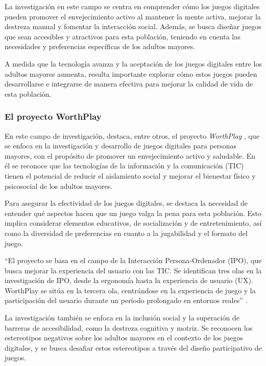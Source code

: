 La investigación en este campo se centra en comprender cómo los juegos digitales pueden promover el envejecimiento activo al mantener la mente activa, mejorar la destreza manual y fomentar la interacción social. Además, se busca diseñar juegos que sean accesibles y atractivos para esta población, teniendo en cuenta las necesidades y preferencias específicas de los adultos mayores.

A medida que la tecnología avanza y la aceptación de los juegos digitales entre los adultos mayores aumenta, resulta importante explorar cómo estos juegos pueden desarrollarse e integrarse de manera efectiva para mejorar la calidad de vida de esta población.


\subsubsection{El proyecto WorthPlay}

En este campo de investigación, destaca, entre otros, el proyecto \textit{WorthPlay} \parencite{WorthPlay2012}, que se enfoca en la investigación y desarrollo de juegos digitales para personas mayores, con el propósito de promover un envejecimiento activo y saludable. En él se reconoce que las tecnologías de la información y la comunicación (TIC) tienen el potencial de reducir el aislamiento social y mejorar el bienestar físico y psicosocial de los adultos mayores.

Para asegurar la efectividad de los juegos digitales, se destaca la necesidad de entender qué aspectos hacen que un juego valga la pena para esta población. Esto implica considerar elementos educativos, de socialización y de entretenimiento, así como la diversidad de preferencias en cuanto a la jugabilidad y el formato del juego.

\enquote{El proyecto se basa en el campo de la Interacción Persona-Ordenador (IPO), que busca mejorar la experiencia del usuario con las TIC. Se identifican tres olas en la investigación de IPO, desde la ergonomía hasta la experiencia de usuario (UX). WorthPlay se sitúa en la tercera ola, centrándose en la experiencia de juego y la participación del usuario durante un período prolongado en entornos reales} \parencite{WorthPlay2012}.

La investigación también se enfoca en la inclusión social y la superación de barreras de accesibilidad, como la destreza cognitiva y motriz. Se reconocen los estereotipos negativos sobre los adultos mayores en el contexto de los juegos digitales, y se busca desafiar estos estereotipos a través del diseño participativo de juegos.

